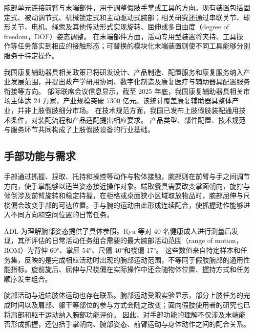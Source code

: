 腕部单元连接前臂与末端部件，用于调整假肢手掌或工具的方向。现有装置包括固定式、被动调节式、机械锁定式和主动驱动式腕部；相关研究还通过串联关节、球形关节、电机、绳索及其他传动形式实现旋转、屈伸或多自由度（degree of freedom，DOF）姿态调整。\cite{Bajaj2019ArtificialWrists,Demofonti2023ModularWrist} 在末端部件方面，活动专用型装置将夹持、工具操作等任务落实到相应的接触形态；可替换的模块化末端装置则使不同工具能够分别服务于特定操作。\cite{Fink2023UpperExtremityProstheses,Chappell2025ModularTerminalDevices}

我国康复辅助器具相关政策已将研发设计、产品制造、配置服务和康复服务纳入产业发展范围，并提出政产学研用协同、数字化制造及康复医疗与辅助器具配置服务衔接等方向。\cite{StateCouncil2016AssistiveDevices} 部际联席会议信息显示，截至 2025 年底，我国康复辅助器具相关市场主体达 24 万家，产业规模突破 7300 亿元。该统计覆盖康复辅助器具整体产业，并非上肢假肢细分市场。\cite{CRDA2026AssistiveIndustryMeeting} 在技术规范方面，我国已发布上肢假肢装配通用技术条件，对装配流程和产品适配提出相应要求。\cite{GBZ409862021UpperLimbAssembly} 产品类型、部件配置、技术规范与服务环节共同构成了上肢假肢设备的行业基础。

\subsection{手部功能与需求}

手部通过抓握、捏取、托持和操控等动作与物体接触，腕部则在前臂与手之间调节方向，使手掌能够以适当姿态接近操作对象。端取餐具需要改变掌面朝向，旋拧与倾倒涉及前臂旋转和稳定持握，在柜格或桌面狭小区域取放物品时，腕部屈伸与尺桡偏会改变手部的可达位置。手与腕的运动由此形成连续配合，使抓握动作能够进入不同方向和空间位置的日常任务。

ADL 为理解腕部姿态提供了具体参照。Ryu 等对 40 名健康成人进行测量后发现，其所评估的日常活动任务组合需要的最大腕部活动范围（range of motion，ROM）为背伸 60°、掌屈 54°、尺偏 40°和桡偏 17°。\cite{Ryu1991FunctionalWristROM} 这些数值来自特定样本和任务集，反映的是完成相应活动时出现的腕部运动范围，不等同于假肢腕部的通用性能指标。旋前旋后、屈伸与尺桡偏在实际操作中还会随物体位置、握持方式和任务顺序发生组合。

腕部活动与近端肢体运动也存在联系。腕部运动受限实验显示，部分上肢任务的完成时间以及肩部、躯干等部位的参与方式会随之改变；面向假肢使用者的研究也已将肩部和躯干运动纳入腕部功能评价。\cite{Adams2003ImpairedWristMotion,Deijs2016FlexibleStaticWrists} 因此，对手部功能的理解不仅涉及末端能否形成抓握，还包括手掌朝向、腕部姿态、前臂运动与身体动作之间的配合关系。

